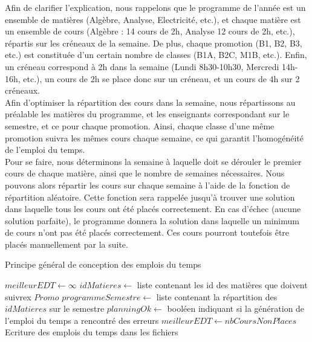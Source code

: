 \documentclass[12pt,a4paper,french]{article}
\begin{document}
Afin de clarifier l'explication, nous rappelons que le programme de l'année est un ensemble de matières (Algèbre, Analyse, Electricité, etc.), et chaque matière est un ensemble de cours (Algèbre : 14 cours de 2h, Analyse 12 cours de 2h, etc.), répartis sur les créneaux de la semaine. De plus, chaque promotion (B1, B2, B3, etc.) est constituée d'un certain nombre de classes (B1A, B2C, M1B, etc.).
Enfin, un créneau correspond à 2h dans la semaine (Lundi 8h30-10h30, Mercredi 14h-16h, etc.), un cours de 2h se place donc sur un créneau, et un cours de 4h sur 2 créneaux.\\

Afin d'optimiser la répartition des cours dans la semaine, nous répartissons au préalable les matières du programme, et les enseignants correspondant sur le semestre, et ce pour chaque promotion. Ainsi, chaque classe d'une même promotion suivra les mêmes cours chaque semaine, ce qui garantit l'homogénéité de l'emploi du temps.\\

Pour se faire, nous déterminons la semaine à laquelle doit se dérouler le premier cours de chaque matière, ainsi que le nombre de semaines nécessaires. Nous pouvons alors répartir les cours sur chaque semaine à l'aide de la fonction de répartition aléatoire. Cette fonction sera rappelée jusqu'à trouver une solution dans laquelle tous les cours ont été placés correctement. En cas d'échec (aucune solution parfaite), le programme donnera la solution dans laquelle un minimum de cours n'ont pas été placés correctement. Ces cours pourront toutefois être placés manuellement par la suite.\\

\newpage

\begin{algorithm}
\caption{Principe général de conception des emplois du temps}
\begin{algorithmic}
\STATE $meilleurEDT \leftarrow \infty$
\REPEAT
{}
\STATE $idMatieres \leftarrow$ liste contenant les id des matières que doivent suivrex $Promo$
\STATE $programmeSemestre \leftarrow $ liste contenant la répartition des $idMatieres$ sur le semestre
\STATE $planningOk \leftarrow$ booléen indiquant si la génération de l'emploi du temps a rencontré des erreurs
\ENDFOR
{}
\STATE $meilleurEDT \leftarrow nbCoursNonPlaces$
\STATE Ecriture des emplois du temps dans les fichiers
\ENDIF
\ENDIF
{}
\end{algorithmic}
\end{algorithm}
\end{document}
